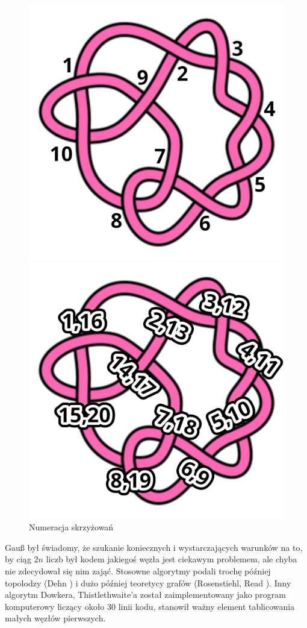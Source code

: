 \begin{figure}[H]
    \centering
    \begin{minipage}[b]{.45\linewidth}
        \centering
        \includegraphics[width=0.65\linewidth]{../data/mixed/gauss_code.png}
    \end{minipage}
    \quad
    \begin{minipage}[b]{.45\linewidth}
        \centering
        \includegraphics[width=0.65\linewidth]{../data/mixed/dowker_code.png}
    \end{minipage}
    \caption[gauss-dowker-thistlethwaite]{Numeracja skrzyżowań}
    \label{gauss_dt}%
\end{figure}

Gauß był świadomy, że szukanie koniecznych i wystarczających warunków na to, by ciąg $2n$ liczb był kodem jakiegoś węzła jest ciekawym problemem, ale chyba nie zdecydował się nim zająć.
Stosowne algorytmy podali trochę później topolodzy (Dehn \cite{dehn1936}) i dużo później teoretycy grafów (Rosenstiehl, Read \cite{rosenstiehl1978}).
Inny algorytm Dowkera, Thistlethwaite'a \cite{dowker1983} został zaimplementowany jako program komputerowy liczący około 30 linii kodu, stanowił ważny element tablicowania małych węzłów pierwszych.

